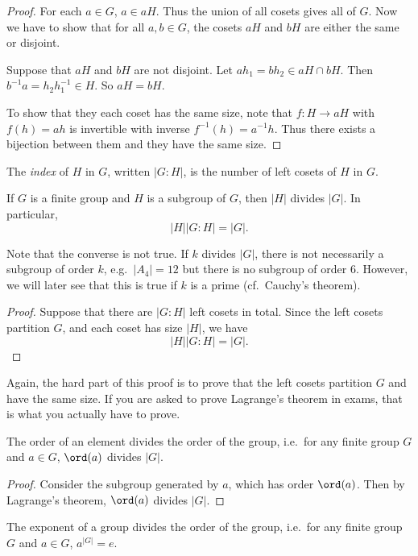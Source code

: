 \documentclass[a4paper]{article}
\begin{document}
\begin{proof}
  For each $a\in G$, $a\in aH$. Thus the union of all cosets gives all of $G$. Now we have to show that for all $a, b\in G$, the cosets $aH$ and $bH$ are either the same or disjoint.

  Suppose that $aH$ and $bH$ are not disjoint. Let $ah_1 = bh_2 \in aH \cap bH$. Then $b^{-1}a = h_2 h_1^{-1}\in H$. So $aH = bH$.

   To show that they each coset has the same size, note that $f: H \to aH$ with $f(h) = ah$ is invertible with inverse $f^{-1}(h) = a^{-1}h$. Thus there exists a bijection between them and they have the same size.
\end{proof}

\begin{defi}
  The \emph{index} of $H$ in $G$, written $|G:H|$, is the number of left cosets of $H$ in $G$.
\end{defi}

\begin{thm}
  If $G$ is a finite group and $H$ is a subgroup of $G$, then $|H|$ divides $|G|$. In particular,
  \[
    |H||G:H| = |G|.
  \]
\end{thm}
Note that the converse is not true. If $k$ divides $|G|$, there is not necessarily a subgroup of order $k$, e.g.\ $|A_4| = 12$ but there is no subgroup of order $6$. However, we will later see that this is true if $k$ is a prime (cf.\ Cauchy's theorem).

\begin{proof}
  Suppose that there are $|G: H|$ left cosets in total. Since the left cosets partition $G$, and each coset has size $|H|$, we have
  \[
    |H||G:H| = |G|.
  \]
\end{proof}
Again, the hard part of this proof is to prove that the left cosets partition $G$ and have the same size. If you are asked to prove Lagrange's theorem in exams, that is what you actually have to prove.

\begin{cor}
  The order of an element divides the order of the group, i.e.\ for any finite group $G$ and $a\in G$, $\ord(a)$ divides $|G|$.
\end{cor}
\begin{proof}
  Consider the subgroup generated by $a$, which has order $\ord(a)$. Then by Lagrange's theorem, $\ord(a)$ divides $|G|$.
\end{proof}

\begin{cor}
  The exponent of a group divides the order of the group, i.e.\ for any finite group $G$ and $a\in G$, $a^{|G|} = e$.
\end{cor}
\end{document}
